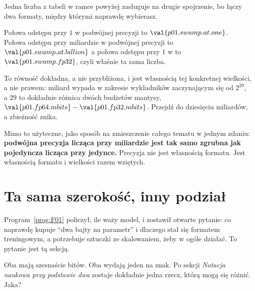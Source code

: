 \begin{fr}

Jedna liczba z tabeli w ramce powyżej zasługuje na drugie spojrzenie, bo
łączy dwa formaty, między którymi naprawdę wybierasz.

Połowa odstępu przy $1$ w podwójnej precyzji to $\val{p01.swamp.at.one}$.
Połowa odstępu przy miliardzie w podwójnej precyzji to
$\val{p01.swamp.at.billion}$ \dash{} a połowa odstępu przy $1$ w 
to $\val{p01.swamp.fp32}$, czyli właśnie ta sama liczba.

To równość dokładna, a nie przybliżona, i jest własnością tej konkretnej
wielkości, a nie prawem: miliard wypada w zakresie wykładników zaczynającym
się od $2^{29}$, a $29$ to dokładnie różnica dwóch budżetów mantysy,
$\val{p01.fp64.mbits} - \val{p01.fp32.mbits}$. Przejdź do dziesięciu
miliardów, a zbieżność znika.

Mimo to użyteczne, jako sposób na zmieszczenie całego tematu w jednym zdaniu:
\textbf{podwójna precyzja licząca przy miliardzie jest tak samo zgrubna jak
pojedyncza licząca przy jedynce.} Precyzja nie jest własnością formatu. Jest
własnością formatu i wielkości razem wziętych.
\end{fr}

\section{Ta sama szerokość, inny podział}
\label{sec:P01-split}

\begin{fr}
Program~\ref{prog:F01} policzył, ile waży model, i zostawił otwarte pytanie:
co naprawdę kupuje \enquote{dwa bajty na parametr} i dlaczego 
stał się formatem treningowym, a  potrzebuje sztuczki ze
skalowaniem, żeby w ogóle działać. To pytanie jest tą sekcją.

Oba mają szesnaście bitów. Oba wydają jeden na znak. Po sekcji \emph{Notacja naukowa przy podstawie dwa} zostaje
dokładnie jedna rzecz, którą mogą się różnić. Jaka?
\nextframe
\end{fr}

